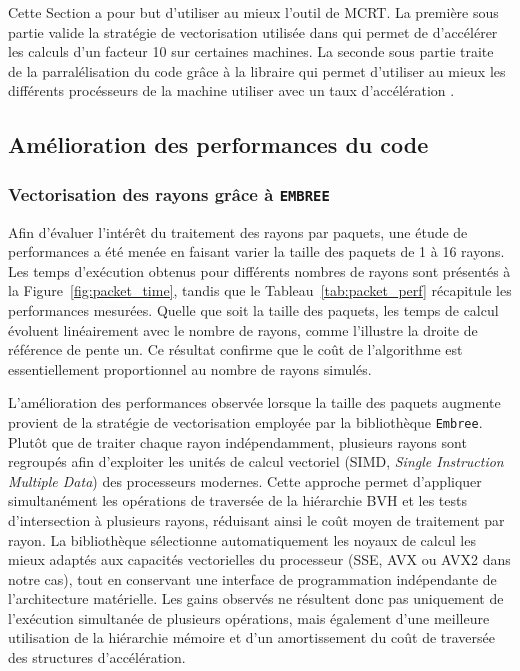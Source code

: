 Cette Section a pour but d'utiliser au mieux l'outil de MCRT. La première sous partie valide la stratégie de vectorisation utilisée dans  qui permet de d'accélérer les calculs d'un facteur 10 sur certaines machines. La seconde sous partie traite de la parralélisation du code grâce à la libraire  qui permet d'utiliser au mieux les différents procésseurs de la machine utiliser avec un taux d'accélération .
\subsection{Amélioration des performances du code}
\subsubsection{Vectorisation des rayons grâce à \texttt{EMBREE}}
Afin d'évaluer l'intérêt du traitement des rayons par paquets, une étude de performances a été menée en faisant varier la taille des paquets de 1 à 16 rayons. Les temps d'exécution obtenus pour différents nombres de rayons sont présentés à la Figure~\ref{fig:packet_time}, tandis que le Tableau~\ref{tab:packet_perf} récapitule les performances mesurées. Quelle que soit la taille des paquets, les temps de calcul évoluent linéairement avec le nombre de rayons, comme l'illustre la droite de référence de pente un. Ce résultat confirme que le coût de l'algorithme est essentiellement proportionnel au nombre de rayons simulés.

L'amélioration des performances observée lorsque la taille des paquets augmente provient de la stratégie de vectorisation employée par la bibliothèque \texttt{Embree}. Plutôt que de traiter chaque rayon indépendamment, plusieurs rayons sont regroupés afin d'exploiter les unités de calcul vectoriel (SIMD, \textit{Single Instruction Multiple Data}) des processeurs modernes. Cette approche permet d'appliquer simultanément les opérations de traversée de la hiérarchie BVH et les tests d'intersection à plusieurs rayons, réduisant ainsi le coût moyen de traitement par rayon. La bibliothèque sélectionne automatiquement les noyaux de calcul les mieux adaptés aux capacités vectorielles du processeur (SSE, AVX ou AVX2 dans notre cas), tout en conservant une interface de programmation indépendante de l'architecture matérielle. Les gains observés ne résultent donc pas uniquement de l'exécution simultanée de plusieurs opérations, mais également d'une meilleure utilisation de la hiérarchie mémoire et d'un amortissement du coût de traversée des structures d'accélération. 

